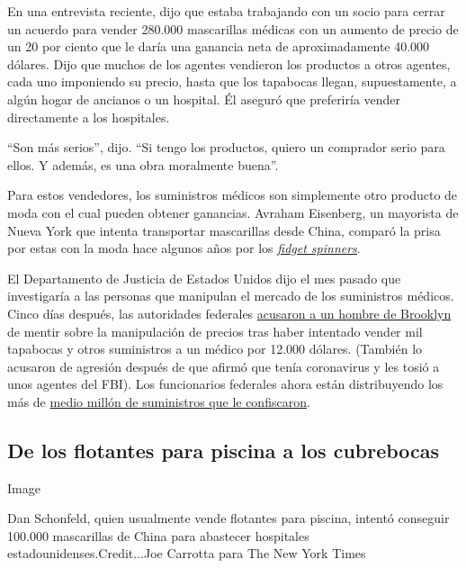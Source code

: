 En una entrevista reciente, dijo que estaba trabajando con un socio para
cerrar un acuerdo para vender 280.000 mascarillas médicas con un aumento
de precio de un 20 por ciento que le daría una ganancia neta de
aproximadamente 40.000 dólares. Dijo que muchos de los agentes vendieron
los productos a otros agentes, cada uno imponiendo su precio, hasta que
los tapabocas llegan, supuestamente, a algún hogar de ancianos o un
hospital. Él aseguró que preferiría vender directamente a los
hospitales.

``Son más serios'', dijo. ``Si tengo los productos, quiero un comprador
serio para ellos. Y además, es una obra moralmente buena''.

Para estos vendedores, los suministros médicos son simplemente otro
producto de moda con el cual pueden obtener ganancias. Avraham
Eisenberg, un mayorista de Nueva York que intenta transportar
mascarillas desde China, comparó la prisa por estas con la moda hace
algunos años por los
\href{https://www.nytimes3xbfgragh.onion/2017/08/15/magazine/the-rise-of-the-fidget-spinner-and-the-fall-of-the-well-managed-fad.html}{\emph{fidget
spinners}}.

El Departamento de Justicia de Estados Unidos dijo el mes pasado que
investigaría a las personas que manipulan el mercado de los suministros
médicos. Cinco días después, las autoridades federales
\href{https://www.bloomberg.com/news/articles/2020-03-30/suspected-mask-profiteer-arrested-for-coughing-on-fbi-agents}{acusaron
a un hombre de Brooklyn} de mentir sobre la manipulación de precios tras
haber intentado vender mil tapabocas y otros suministros a un médico por
12.000 dólares. (También lo acusaron de agresión después de que afirmó
que tenía coronavirus y les tosió a unos agentes del FBI). Los
funcionarios federales ahora están distribuyendo los más de
\href{https://www.hhs.gov/about/news/2020/04/02/doj-and-hhs-partner-to-distribute-more-than-half-a-million-medical-supplies-confiscated-from-price-gougers.html}{medio
millón de suministros que le confiscaron}.

\hypertarget{de-los-flotantes-para-piscina-a-los-cubrebocas}{%
\subsection{De los flotantes para piscina a los
cubrebocas}\label{de-los-flotantes-para-piscina-a-los-cubrebocas}}

Image

Dan Schonfeld, quien usualmente vende flotantes para piscina, intentó
conseguir 100.000 mascarillas de China para abastecer hospitales
estadounidenses.Credit...Joe Carrotta para The New York Times

